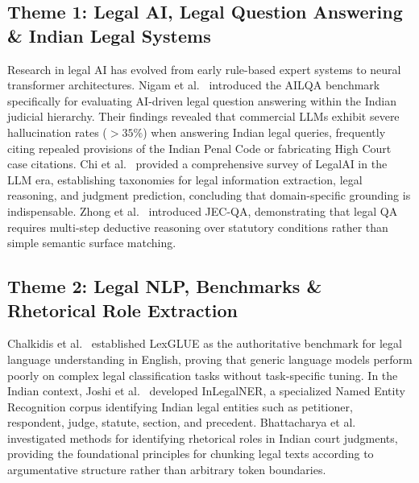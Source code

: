 \subsection{Theme 1: Legal AI, Legal Question Answering \& Indian Legal Systems}
Research in legal AI has evolved from early rule-based expert systems to neural transformer architectures. Nigam et al.~\cite{nigam2026ailqa} introduced the AILQA benchmark specifically for evaluating AI-driven legal question answering within the Indian judicial hierarchy. Their findings revealed that commercial LLMs exhibit severe hallucination rates ($>35\%$) when answering Indian legal queries, frequently citing repealed provisions of the Indian Penal Code or fabricating High Court case citations. Chi et al.~\cite{chi2026legalai} provided a comprehensive survey of LegalAI in the LLM era, establishing taxonomies for legal information extraction, legal reasoning, and judgment prediction, concluding that domain-specific grounding is indispensable. Zhong et al.~\cite{zhong2020jecqa} introduced JEC-QA, demonstrating that legal QA requires multi-step deductive reasoning over statutory conditions rather than simple semantic surface matching.

\subsection{Theme 2: Legal NLP, Benchmarks \& Rhetorical Role Extraction}
Chalkidis et al.~\cite{chalkidis2022lexglue} established LexGLUE as the authoritative benchmark for legal language understanding in English, proving that generic language models perform poorly on complex legal classification tasks without task-specific tuning. In the Indian context, Joshi et al.~\cite{joshi2024inlegalner} developed InLegalNER, a specialized Named Entity Recognition corpus identifying Indian legal entities such as petitioner, respondent, judge, statute, section, and precedent. Bhattacharya et al.~\cite{bhattacharya2019identification} investigated methods for identifying rhetorical roles in Indian court judgments, providing the foundational principles for chunking legal texts according to argumentative structure rather than arbitrary token boundaries.

